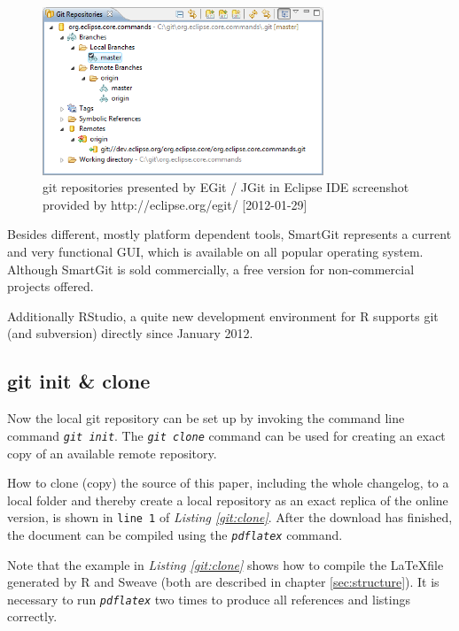 \documentclass{ifacconf}
\begin{document}
\begin{figure}[h]
\begin{center}
\includegraphics[width=8.4cm]{pics/EGit.png}    %
\caption{git repositories presented by EGit / JGit in Eclipse IDE \newline 
screenshot provided by http://eclipse.org/egit/ [2012-01-29]} 
\label{fig:JGit}
\end{center}
\end{figure}

Besides different, mostly platform dependent tools, 
SmartGit represents a current and very functional GUI, which
is available on all popular operating system. Although SmartGit is sold commercially,
a free version for non-commercial projects offered.

Additionally RStudio, a quite new development environment for R supports git (and subversion)
directly since January 2012.


\subsection{git init \& clone}
Now the local git repository can be set up by invoking the
command line command \textit{\lstinline!git init!}. The \textit{\lstinline!git clone!} 
command can be used for creating an exact copy of an available remote repository.

How to clone (copy) the source of this paper, including the whole changelog, to a local folder 
and thereby create a local repository as an exact replica of the online version,
is shown in \verb|line 1| of \textit{Listing \ref{git:clone}}. After the download has
finished, the document can be compiled using the \textit{\lstinline!pdflatex!} command. 

Note that the example in \textit{Listing \ref{git:clone}} shows how to compile 
the \LaTeX file generated by R and Sweave (both are described in chapter \ref{sec:structure}).
It is necessary to run \textit{\lstinline!pdflatex!} two times to produce all references and
listings correctly. 
\end{document}
